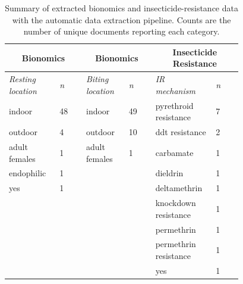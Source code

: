 \begin{table}[ht]
\centering
\caption{Summary of extracted bionomics and insecticide-resistance data with the automatic data extraction pipeline. Counts are the number of unique documents reporting each category.}
\label{tab:summary_bio_ir}
\small
\begin{tabular}{p{0.16\linewidth}|p{0.10\linewidth}|p{0.16\linewidth}|p{0.10\linewidth}|p{0.16\linewidth}|p{0.10\linewidth}}
\toprule
\multicolumn{2}{c|}{\textbf{Bionomics}} & \multicolumn{2}{c|}{\textbf{Bionomics}} & \multicolumn{2}{c}{\textbf{Insecticide Resistance}} \\
\midrule
\textit{Resting location} & \textit{n} & \textit{Biting location} & \textit{n} & \textit{IR mechanism} & \textit{n} \\
\midrule
indoor & 48 & indoor & 49 & pyrethroid resistance & 7 \\
\midrule
outdoor & 4 & outdoor & 10 & ddt resistance & 2 \\
\midrule
adult females & 1 & adult females & 1 & carbamate & 1 \\
\midrule
endophilic & 1 &  &  & dieldrin & 1 \\
\midrule
yes & 1 &  &  & deltamethrin & 1 \\
\midrule
 &  &  &  & knockdown resistance & 1 \\
\midrule
 &  &  &  & permethrin & 1 \\
\midrule
 &  &  &  & permethrin resistance & 1 \\
\midrule
 &  &  &  & yes & 1 \\
\bottomrule
\end{tabular}
\end{table}
